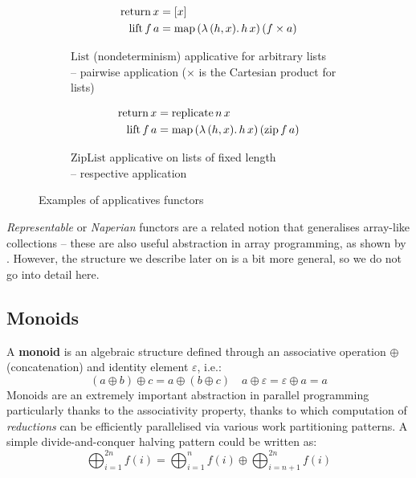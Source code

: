 \begin{figure}[h]
\centering
\begin{subfigure}{.5\textwidth}
  \centering
  \begin{align*}
\mathrm{return}\,x &= [x] \\
\mathrm{lift}\,f\,a &= \mathrm{map}\,(\lambda\,(h, x) \ldotp h\,x)\,(f \times a)
  \end{align*}
  \caption{$\mathrm{List}$ (nondeterminism) applicative for arbitrary lists \\ -- pairwise application ($\times$ is the Cartesian product for lists)}
\end{subfigure}%
\begin{subfigure}{.5\textwidth}
  \centering
  \begin{align*}
\mathrm{return}\,x &= \mathrm{replicate}\,n\,x \\
\mathrm{lift}\,f\,a &= \mathrm{map}\,(\lambda\,(h, x) \ldotp h\,x)\,(\mathrm{zip}\,f\,a)
  \end{align*}
  \caption{$\mathrm{ZipList}$ applicative on lists of fixed length \\ -- respective application}
\end{subfigure}
\caption{Examples of applicatives functors}
\label{fig:applicatives}
\end{figure}

\textit{Representable} or \textit{Naperian} functors are a related notion that generalises array-like collections -- these are also useful abstraction in array programming, as shown by \textcite{gibbons2016aplicative}. However, the structure we describe later on is a bit more general, so we do not go into detail here.

\subsection{Monoids}

A \textbf{monoid} is an algebraic structure defined through an associative operation $\oplus$ (concatenation) and identity element $\varepsilon$, i.e.:
$$ (a \oplus b) \oplus c = a \oplus (b \oplus c) \quad a \oplus \varepsilon = \varepsilon \oplus a = a $$
Monoids are an extremely important abstraction in parallel programming particularly thanks to the associativity property, thanks to which computation of \textit{reductions} can be efficiently parallelised via various work partitioning patterns. A simple divide-and-conquer halving pattern could be written as:
$$ \bigoplus_{i=1}^{2n} f(i) = \bigoplus_{i=1}^{n} f(i) \oplus \bigoplus_{i=n+1}^{2n} f(i) $$


